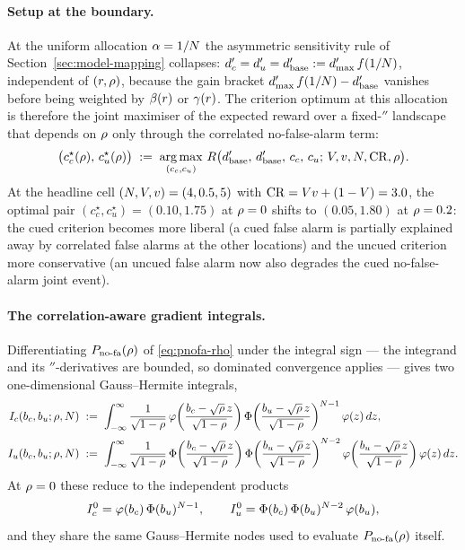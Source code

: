 \paragraph{Setup at the boundary.}
At the uniform allocation $\alpha = 1/N$ the asymmetric sensitivity
rule of Section~\ref{sec:model-mapping} collapses:
$d'_c = d'_u = d'_{\mathrm{base}} := d'_{\max}\,
f(1/N)$, independent of $(r, \rho)$, because the
gain bracket $d'_{\max}\, f(1/N) - d'_{\mathrm{base}}$ vanishes
before being weighted by $\beta(r)$ or $\gamma(r)$. The
criterion optimum at this allocation is therefore the joint maximiser of
the expected reward over a fixed-$\dprime$ landscape that depends on
$\rho$ only through the correlated no-false-alarm term:
\begin{equation}
  \bigl(c_c^\star(\rho),\, c_u^\star(\rho)\bigr)
  \;:=\;
  \operatorname*{arg\,max}_{(c_c, c_u)}\,
  R\bigl(d'_{\mathrm{base}},\, d'_{\mathrm{base}},\,
           c_c,\, c_u;\, V, v, N, \mathrm{CR}, \rho\bigr).
  \label{eq:boundary-crit}
\end{equation}
At the headline cell $(N, V, v) = (4, 0.5, 5)$ with
$\mathrm{CR} = Vv + (1 - V) = 3.0$, the optimal pair
$(c_c^\star, c_u^\star) = (0.10, 1.75)$ at $\rho = 0$ shifts to
$(0.05, 1.80)$ at $\rho = 0.2$: the cued criterion becomes more liberal
(a cued false alarm is partially explained away by correlated false
alarms at the other locations) and the uncued criterion more
conservative (an uncued false alarm now also degrades the cued
no-false-alarm joint event).

\paragraph{The correlation-aware gradient integrals.}
Differentiating $P_{\mathrm{no\text{-}fa}}(\rho)$ of \eqref{eq:pnofa-rho} under the
integral sign — the integrand and its $\dprime$-derivatives are bounded,
so dominated convergence applies — gives two one-dimensional
Gauss--Hermite integrals,
\begin{align}
  I_c(b_c, b_u; \rho, N)
  &\;:=\;
  \int_{-\infty}^{\infty}
  \frac{1}{\sqrt{1 - \rho}}\,
  \varphi\!\left(\frac{b_c - \sqrt{\rho}\,z}{\sqrt{1 - \rho}}\right)
  \Phi\!\left(\frac{b_u - \sqrt{\rho}\,z}{\sqrt{1 - \rho}}\right)^{N - 1}
  \varphi(z)\,dz,
  \label{eq:gh-grad-c}
  \\[2pt]
  I_u(b_c, b_u; \rho, N)
  &\;:=\;
  \int_{-\infty}^{\infty}
  \frac{1}{\sqrt{1 - \rho}}\,
  \Phi\!\left(\frac{b_c - \sqrt{\rho}\,z}{\sqrt{1 - \rho}}\right)
  \Phi\!\left(\frac{b_u - \sqrt{\rho}\,z}{\sqrt{1 - \rho}}\right)^{N - 2}
  \varphi\!\left(\frac{b_u - \sqrt{\rho}\,z}{\sqrt{1 - \rho}}\right)
  \varphi(z)\,dz.
  \label{eq:gh-grad-u}
\end{align}
At $\rho = 0$ these reduce to the independent products
\begin{equation*}
  I_c^0 = \varphi(b_c)\,\Phi(b_u)^{N - 1},
  \qquad
  I_u^0 = \Phi(b_c)\,\Phi(b_u)^{N - 2}\,\varphi(b_u),
\end{equation*}
and they share the same Gauss--Hermite nodes used to evaluate
$P_{\mathrm{no\text{-}fa}}(\rho)$ itself.

